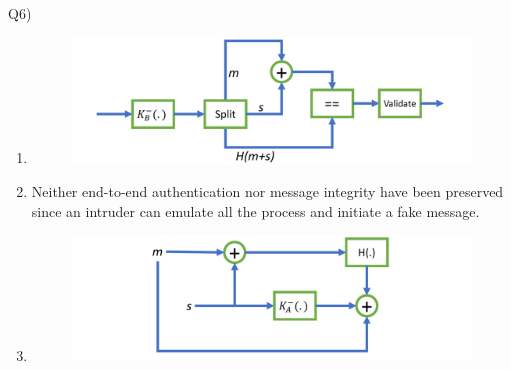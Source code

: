 \documentclass[10pt,letterpaper]{article}
\begin{document}
Q6)

\begin{enumerate}[label=\alph*-]
\item
\begin{figure}[htbp]
\centering
\includegraphics[width=140mm]{decrypt.pdf}
\end{figure}
\item
Neither end-to-end authentication nor message integrity have been preserved since an intruder can emulate all the process and initiate a fake message.

\item
\begin{figure}[htbp]
\centering
\includegraphics[width=140mm]{enc_mod.pdf}
\end{figure}
\end{enumerate}
\end{document}
